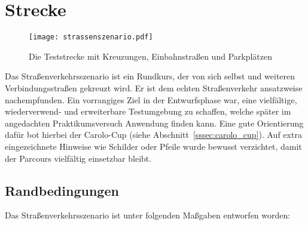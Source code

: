\section{Strecke \dcfirstauthorshort}

\begin{figure}[htbp] %
  \centering
  \texttt{[image: strassenszenario.pdf]}
  \caption{Die Teststrecke mit Kreuzungen, Einbahnstraßen und Parkplätzen}
  \label{fig:strassenszenario}
\end{figure}
Das Straßenverkehrsszenario ist ein Rundkurs, der von sich selbst und weiteren Verbindungsstraßen gekreuzt wird. Er ist dem echten Straßenverkehr ansatzweise nachempfunden.
Ein vorrangiges Ziel in der Entwurfsphase war, eine vielfältige, wiederverwend- und erweiterbare Testumgebung zu schaffen, welche später im angedachten Praktikumsversuch Anwendung finden kann. Eine gute Orientierung dafür bot hierbei der Carolo-Cup (siehe Abschnitt~\ref{sssec:carolo_cup}). Auf extra eingezeichnete Hinweise wie Schilder oder Pfeile wurde bewusst verzichtet, damit der Parcours vielfältig einsetzbar bleibt.

\subsection{Randbedingungen}

Das Straßenverkehrsszenario ist unter folgenden Maßgaben entworfen worden:

